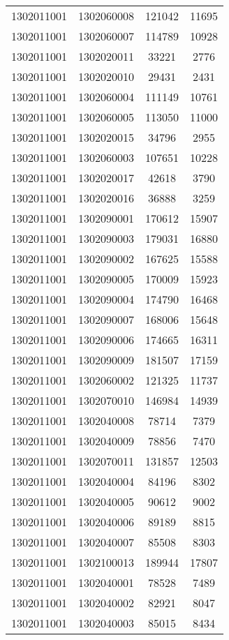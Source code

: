 \begin{longtable}[h]{llcc}
		1302011001 & 1302060008 & 121042 & 11695\\
		1302011001 & 1302060007 & 114789 & 10928\\
		1302011001 & 1302020011 & 33221 & 2776\\
		1302011001 & 1302020010 & 29431 & 2431\\
		1302011001 & 1302060004 & 111149 & 10761\\
		1302011001 & 1302060005 & 113050 & 11000\\
		1302011001 & 1302020015 & 34796 & 2955\\
		1302011001 & 1302060003 & 107651 & 10228\\
		1302011001 & 1302020017 & 42618 & 3790\\
		1302011001 & 1302020016 & 36888 & 3259\\
		1302011001 & 1302090001 & 170612 & 15907\\
		1302011001 & 1302090003 & 179031 & 16880\\
		1302011001 & 1302090002 & 167625 & 15588\\
		1302011001 & 1302090005 & 170009 & 15923\\
		1302011001 & 1302090004 & 174790 & 16468\\
		1302011001 & 1302090007 & 168006 & 15648\\
		1302011001 & 1302090006 & 174665 & 16311\\
		1302011001 & 1302090009 & 181507 & 17159\\
		1302011001 & 1302060002 & 121325 & 11737\\
		1302011001 & 1302070010 & 146984 & 14939\\
		1302011001 & 1302040008 & 78714 & 7379\\
		1302011001 & 1302040009 & 78856 & 7470\\
		1302011001 & 1302070011 & 131857 & 12503\\
		1302011001 & 1302040004 & 84196 & 8302\\
		1302011001 & 1302040005 & 90612 & 9002\\
		1302011001 & 1302040006 & 89189 & 8815\\
		1302011001 & 1302040007 & 85508 & 8303\\
		1302011001 & 1302100013 & 189944 & 17807\\
		1302011001 & 1302040001 & 78528 & 7489\\
		1302011001 & 1302040002 & 82921 & 8047\\
		1302011001 & 1302040003 & 85015 & 8434\\

\end{longtable}
